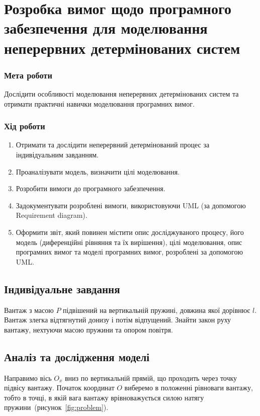 


\newcommand{\labnumber}{2} %



\graphicspath{{figures/}}


\Ukrainian


\addtocounter{page}{1}

\section*{Розробка вимог щодо програмного забезпечення для моделювання неперервних детермінованих систем}
\subsubsection*{Мета роботи}
Дослідити особливості моделювання неперервних детермінованих систем та отримати практичні навички моделювання програмних вимог.
\subsubsection*{Хід роботи}
\begin{enumerate}
\item Отримати та дослідити неперервний детермінований процес за індивідуальним завданням.
\item Проаналізувати модель, визначити цілі моделювання.
\item Розробити вимоги до програмного забезпечення.
\item Задокументувати розроблені вимоги, використовуючи UML (за допомогою Requirement diagram).
\item Оформити звіт, який повинен містити опис досліджуваного процесу, його модель (диференційні рівняння та їх вирішення), цілі моделювання, опис програмних вимог та моделі програмних вимог, розроблені за допомогою UML.
\end{enumerate}

\subsection{Індивідуальне завдання}
Вантаж з масою $P$ підвішений на вертикальній пружині, довжина якої дорівнює $l$. 
Вантаж злегка відтягнутий донизу і потім відпущений.
Знайти закон руху вантажу, нехтуючи масою пружини та опором повітря.

\subsection{Аналіз та дослідження моделі}
Направимо вісь $O_x$ вниз по вертикальній прямій, що проходить через точку підвісу вантажу.
Початок координат $O$ виберемо в положенні рівноваги вантажу, тобто в точці, в якій вага вантажу врівноважується силою натягу пружини~(рисунок~\ref{fig:problem}).

